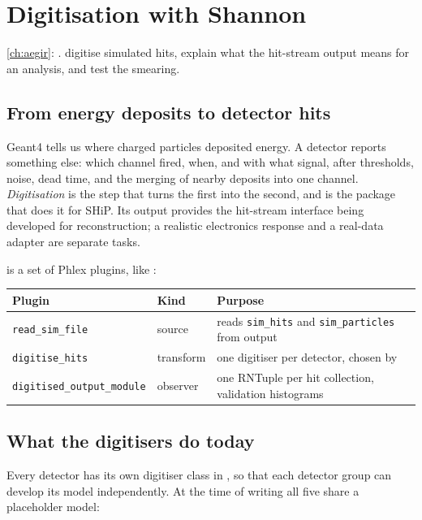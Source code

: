 \chapter{Digitisation with Shannon}
\label{ch:digitisation}

{\cref{ch:aegir}: .}
{digitise simulated hits, explain what the hit-stream output means for an analysis, and test the smearing.}

\section{From energy deposits to detector hits}

Geant4 tells us where charged particles deposited energy. A detector reports
something else: which channel fired, when, and with what signal, after
thresholds, noise, dead time, and the merging of nearby deposits into one
channel. \emph{Digitisation} is the step that turns the first into the second,
and  is the package that does it for SHiP. Its output provides the hit-stream interface being developed for reconstruction;
a realistic electronics response and a real-data adapter are separate tasks.

 is a set of Phlex plugins, like :

\begin{center}
\small
\begin{tabularx}{\linewidth}{l l L}
\toprule
Plugin & Kind & Purpose \\
\midrule
\texttt{read\_sim\_file}            & source   & reads \texttt{sim\_hits} and \texttt{sim\_particles} from  output \\
\texttt{digitise\_hits}             & transform& one digitiser per detector, chosen by  \\
\texttt{digitised\_output\_module}  & observer & one RNTuple per hit collection, validation histograms \\
\bottomrule
\end{tabularx}
\end{center}

\section{What the digitisers do today}

Every detector has its own digitiser class in , so that
each detector group can develop its model independently. At the time of
writing all five share a placeholder model:

